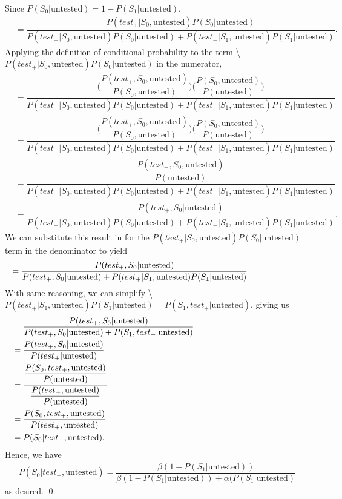 \documentclass[12pt,twoside]{smiththesis}
\begin{document}
\noindent Since \(P(S_0|\text{untested}) = 1 - P(S_1|\text{untested})\),
\begin{align*} 
&=  \dfrac{{P(test_+|S_0, \text{untested})}P(S_0|\text{untested})}{P(test_+|S_0, \text{untested})P(S_0|\text{untested}) + P(test_+|S_1, \text{untested}) P(S_1|\text{untested})}.
\end{align*}
Applying the definition of conditional probability to the term \textbackslash{} \(P(test_+|S_0, \text{untested})P(S_0|\text{untested})\) in the numerator,
\begin{align*}
&=
    \dfrac{\Big( \dfrac{P(test_+,S_0, \text{untested})}{P(S_0, \text{untested})} \Big) \Big(\dfrac{P(S_0, \text{untested})}{P(\text{untested})}\Big)}{P(test_+|S_0, \text{untested})P(S_0|\text{untested}) + P(test_+|S_1, \text{untested}) P(S_1|\text{untested})}\\ 
    &= \dfrac{\Big( \dfrac{P(test_+,S_0, \text{untested})}{P(S_0, \text{untested})} \Big) \Big(\dfrac{P(S_0, \text{untested})}{P(\text{untested})}\Big)}{P(test_+|S_0, \text{untested})P(S_0|\text{untested}) + P(test_+|S_1, \text{untested}) P(S_1|\text{untested})}\\
    &=  \dfrac{\dfrac{P(test_+,S_0, \text{untested})}{P(\text{untested})}}{P(test_+|S_0, \text{untested})P(S_0|\text{untested}) + P(test_+|S_1, \text{untested}) P(S_1|\text{untested})}\\
    &=  \dfrac{{P(test_+,S_0|\text{untested})}}{P(test_+|S_0, \text{untested})P(S_0|\text{untested}) + P(test_+|S_1, \text{untested}) P(S_1|\text{untested})}.
\end{align*}
\noindent We can substitute this result in for the \(P(test_+|S_0, \text{untested})P(S_0|\text{untested})\) term in the denominator to yield
\begin{align*}
  &=  \dfrac{{P(test_+,S_0|\text{untested})}}{P(test_+,S_0|\text{untested}) + P(test_+|S_1, \text{untested}) P(S_1|\text{untested})} \hspace{ 20 mm }
\end{align*}
With same reasoning, we can simplify \textbackslash{}\(P(test_+|S_1, \text{untested})P(S_1|\text{untested}) = P(S_1, test_+|\text{untested})\), giving us
\begin{align*}
  &=  \dfrac{{P(test_+,S_0|\text{untested})}}{P(test_+,S_0|\text{untested}) +  P(S_1, test_+|\text{untested})} \hspace{45 mm }\\ 
   &=  \dfrac{{P(test_+,S_0|\text{untested})}}{P(test_+|\text{untested}) } \\
   &= \dfrac{\dfrac{P(S_0, test_+, \text{untested})}{P(\text{untested})}}{ \dfrac{P(test_+,\text{untested})}{P(\text{untested})}} \\ 
  &=\dfrac{P(S_0, test_+, \text{untested})}{P(test_+,\text{untested})} \\
  &= P(S_0 |test_+, \text{untested}).
\end{align*}
\noindent Hence, we have
\begin{align*}
P(S_0 |test_+, \text{untested}) = \dfrac{\beta (1- P(S_1|\text{untested}))}{\beta(1- P(S_1|\text{untested})) + \alpha(P(S_1|\text{untested})}
\end{align*}
\noindent as desired.
\qed
\end{document}
